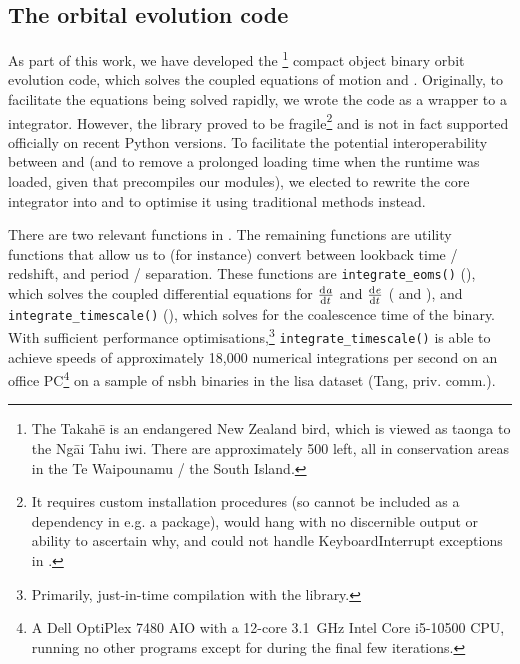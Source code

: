 \subsection{The  orbital evolution code}\label{chap:numerical_methods_takahe}

As part of this work, we have developed the \footnote{The Takah\=e is an endangered New Zealand bird, which is viewed as taonga to the Ng\=ai Tahu iwi. There are approximately 500 left, all in conservation areas in the Te Waipounamu / the South Island.} compact object binary orbit evolution code, which solves the coupled equations of motion  and . Originally, to facilitate the equations being solved rapidly, we wrote the code as a  wrapper to a  \citep{Bezanson:2017} integrator. However, the  library \citep{Arakaki:2023} proved to be fragile\footnote{It requires custom installation procedures (so cannot be included as a dependency in e.g. a  package), would hang with no discernible output or ability to ascertain why, and could not handle KeyboardInterrupt exceptions in .} and is not in fact supported officially on recent Python versions. To facilitate the potential interoperability between  and  (and to remove a prolonged loading time when the  runtime was loaded, given that  precompiles our modules), we elected to rewrite the core integrator into  and to optimise it using traditional  methods instead.

There are two relevant functions in . The remaining functions are utility functions that allow us to (for instance) convert between lookback time / redshift, and period / separation. These functions are \texttt{integrate_eoms()} (), which solves the coupled differential equations for $\dv{a}{t}$ and $\dv{e}{t}$ ( and ), and \texttt{integrate_timescale()} (), which solves  for the coalescence time of the binary. With sufficient performance optimisations,\footnote{Primarily, just-in-time compilation with the  \citep{Lam:2015} library.} \texttt{integrate_timescale()} is able to achieve speeds of approximately 18,000 numerical integrations per second on an office PC\footnote{A Dell OptiPlex 7480 AIO with a 12-core \SI{3.1}{\giga\hertz} Intel Core i5-10500 CPU, running no other programs except for during the final few iterations.} on a sample of \gls{nsbh} binaries in the \gls{lisa} dataset (Tang, priv. comm.).

